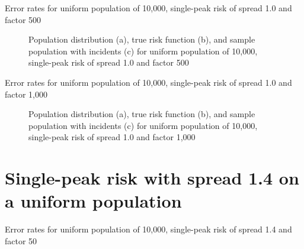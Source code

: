 {%

\begin{table}[H]

\caption[]{Error rates for uniform population of 10,000, single-peak risk of \gls{spread} 1.0 and \gls{factor} 500}
\label{tab:mean_error_rates:unif_500_1.0_1h}
\end{table}

\begin{figure}[H]
    
    \caption[]{Population distribution (a), true risk function (b), and sample population with incidents (c) for uniform population of 10,000, single-peak risk of \gls{spread} 1.0 and \gls{factor} 500}
    \label{fig:distributions:unif_500_1.0_1h}    
\end{figure} \newpage



\begin{table}[H]

\caption[]{Error rates for uniform population of 10,000, single-peak risk of \gls{spread} 1.0 and \gls{factor} 1,000}
\label{tab:mean_error_rates:unif_1000_1.0_1h}
\end{table}

\begin{figure}[H]
    
    \caption[]{Population distribution (a), true risk function (b), and sample population with incidents (c) for uniform population of 10,000, single-peak risk of \gls{spread} 1.0 and \gls{factor} 1,000}
    \label{fig:distributions:unif_1000_1.0_1h}    
\end{figure} \newpage

 
\section{Single-peak risk with spread 1.4 on a uniform population}
\label{sec:app:results_unif_1.4_1h}


\begin{table}[H]
    
    \caption[]{Error rates for uniform population of 10,000, single-peak risk of \gls{spread} 1.4 and \gls{factor} 50}
    \label{tab:mean_error_rates:unif_50_1.4_1h}
\end{table}

}
